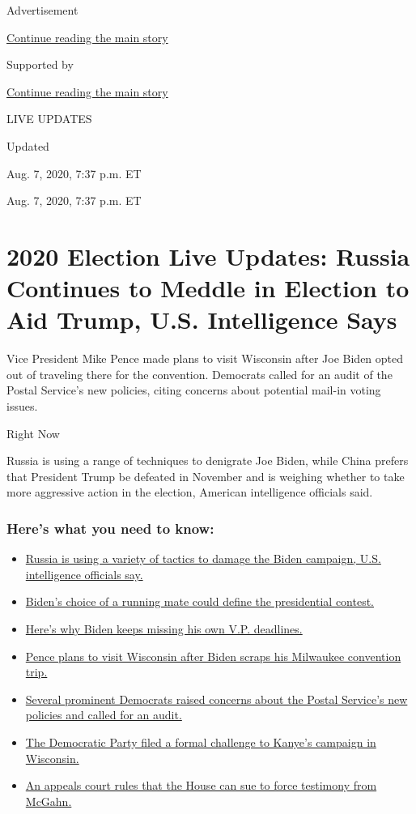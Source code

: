 Advertisement

\protect\hyperlink{after-top}{Continue reading the main story}

Supported by

\protect\hyperlink{after-sponsor}{Continue reading the main story}

LIVE UPDATES

Updated~

Aug. 7, 2020, 7:37 p.m. ET

Aug. 7, 2020, 7:37 p.m. ET

\hypertarget{2020-election-live-updates-russia-continues-to-meddle-in-election-to-aid-trump-us-intelligence-says}{%
\section{2020 Election Live Updates: Russia Continues to Meddle in
Election to Aid Trump, U.S. Intelligence
Says}\label{2020-election-live-updates-russia-continues-to-meddle-in-election-to-aid-trump-us-intelligence-says}}

Vice President Mike Pence made plans to visit Wisconsin after Joe Biden
opted out of traveling there for the convention. Democrats called for an
audit of the Postal Service's new policies, citing concerns about
potential mail-in voting issues.

Right Now

Russia is using a range of techniques to denigrate Joe Biden, while
China prefers that President Trump be defeated in November and is
weighing whether to take more aggressive action in the election,
American intelligence officials said.

\hypertarget{heres-what-you-need-to-know}{%
\subsubsection{Here's what you need to
know:}\label{heres-what-you-need-to-know}}

\begin{itemize}
\tightlist
\item
  \protect\hyperlink{link-77a72de1}{Russia is using a variety of tactics
  to damage the Biden campaign, U.S. intelligence officials say.}
\item
  \protect\hyperlink{link-1ab01601}{Biden's choice of a running mate
  could define the presidential contest.}
\item
  \protect\hyperlink{link-4b53533c}{Here's why Biden keeps missing his
  own V.P. deadlines.}
\item
  \protect\hyperlink{link-676189e6}{Pence plans to visit Wisconsin after
  Biden scraps his Milwaukee convention trip.}
\item
  \protect\hyperlink{link-41982312}{Several prominent Democrats raised
  concerns about the Postal Service's new policies and called for an
  audit.}
\item
  \protect\hyperlink{link-35e50c87}{The Democratic Party filed a formal
  challenge to Kanye's campaign in Wisconsin.}
\item
  \protect\hyperlink{link-7b5f765f}{An appeals court rules that the
  House can sue to force testimony from McGahn.}
\end{itemize}

